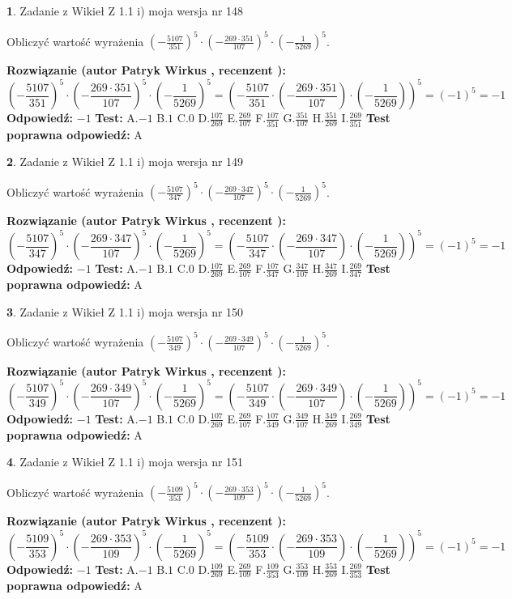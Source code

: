 \documentclass[12pt, a4paper]{article}
\theoremstyle{definition} %
\newtheorem{zad}{}
\newcommand{\zadStart}[1]{\begin{zad}#1\newline}
\newcommand{\zadStop}{\end{zad}}
\newcommand{\rozwStart}[2]{\noindent \textbf{Rozwiązanie (autor #1 , recenzent #2): }\newline}
\newcommand{\rozwStop}{\newline}
\newcommand{\odpStart}{\noindent \textbf{Odpowiedź:}\newline}
\newcommand{\odpStop}{\newline}
\newcommand{\testStart}{\noindent \textbf{Test:}\newline}
\newcommand{\testStop}{\newline}
\newcommand{\kluczStart}{\noindent \textbf{Test poprawna odpowiedź:}\newline}
\newcommand{\kluczStop}{\newline}
\begin{document}
\zadStart{Zadanie z Wikieł Z 1.1 i) moja wersja nr 148}

Obliczyć wartość wyrażenia $(-\frac{5107}{351})^{5} \cdot (-\frac{269 \cdot 351}{107})^{5} \cdot (-\frac{1}{5269})^{5}$.
\zadStop
\rozwStart{Patryk Wirkus}{}
$$(-\frac{5107}{351})^{5} \cdot (-\frac{269 \cdot 351}{107})^{5} \cdot (-\frac{1}{5269})^{5} = (-\frac{5107}{351} \cdot (-\frac{269 \cdot 351}{107}) \cdot (-\frac{1}{5269}))^{5} = (-1)^{5} = -1$$
\rozwStop
\odpStart
$-1$
\odpStop
\testStart
A.$-1$ B.$1$ C.$0$ D.$\frac{107}{269}$ E.$\frac{269}{107}$
F.$\frac{107}{351}$ G.$\frac{351}{107}$
H.$\frac{351}{269}$
I.$\frac{269}{351}$
\testStop
\kluczStart
A
\kluczStop



\zadStart{Zadanie z Wikieł Z 1.1 i) moja wersja nr 149}

Obliczyć wartość wyrażenia $(-\frac{5107}{347})^{5} \cdot (-\frac{269 \cdot 347}{107})^{5} \cdot (-\frac{1}{5269})^{5}$.
\zadStop
\rozwStart{Patryk Wirkus}{}
$$(-\frac{5107}{347})^{5} \cdot (-\frac{269 \cdot 347}{107})^{5} \cdot (-\frac{1}{5269})^{5} = (-\frac{5107}{347} \cdot (-\frac{269 \cdot 347}{107}) \cdot (-\frac{1}{5269}))^{5} = (-1)^{5} = -1$$
\rozwStop
\odpStart
$-1$
\odpStop
\testStart
A.$-1$ B.$1$ C.$0$ D.$\frac{107}{269}$ E.$\frac{269}{107}$
F.$\frac{107}{347}$ G.$\frac{347}{107}$
H.$\frac{347}{269}$
I.$\frac{269}{347}$
\testStop
\kluczStart
A
\kluczStop



\zadStart{Zadanie z Wikieł Z 1.1 i) moja wersja nr 150}

Obliczyć wartość wyrażenia $(-\frac{5107}{349})^{5} \cdot (-\frac{269 \cdot 349}{107})^{5} \cdot (-\frac{1}{5269})^{5}$.
\zadStop
\rozwStart{Patryk Wirkus}{}
$$(-\frac{5107}{349})^{5} \cdot (-\frac{269 \cdot 349}{107})^{5} \cdot (-\frac{1}{5269})^{5} = (-\frac{5107}{349} \cdot (-\frac{269 \cdot 349}{107}) \cdot (-\frac{1}{5269}))^{5} = (-1)^{5} = -1$$
\rozwStop
\odpStart
$-1$
\odpStop
\testStart
A.$-1$ B.$1$ C.$0$ D.$\frac{107}{269}$ E.$\frac{269}{107}$
F.$\frac{107}{349}$ G.$\frac{349}{107}$
H.$\frac{349}{269}$
I.$\frac{269}{349}$
\testStop
\kluczStart
A
\kluczStop



\zadStart{Zadanie z Wikieł Z 1.1 i) moja wersja nr 151}

Obliczyć wartość wyrażenia $(-\frac{5109}{353})^{5} \cdot (-\frac{269 \cdot 353}{109})^{5} \cdot (-\frac{1}{5269})^{5}$.
\zadStop
\rozwStart{Patryk Wirkus}{}
$$(-\frac{5109}{353})^{5} \cdot (-\frac{269 \cdot 353}{109})^{5} \cdot (-\frac{1}{5269})^{5} = (-\frac{5109}{353} \cdot (-\frac{269 \cdot 353}{109}) \cdot (-\frac{1}{5269}))^{5} = (-1)^{5} = -1$$
\rozwStop
\odpStart
$-1$
\odpStop
\testStart
A.$-1$ B.$1$ C.$0$ D.$\frac{109}{269}$ E.$\frac{269}{109}$
F.$\frac{109}{353}$ G.$\frac{353}{109}$
H.$\frac{353}{269}$
I.$\frac{269}{353}$
\testStop
\kluczStart
A
\kluczStop
\end{document}
